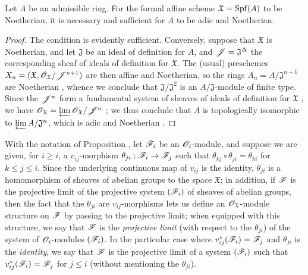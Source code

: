 \begin{corollary}[10.6.5]
\label{1.10.6.5}
Let $A$ be an admissible ring.
For the formal affine scheme $\mathfrak{X}=\operatorname{Spf}(A)$ to be Noetherian, it is necessary and sufficient for $A$ to be adic and Noetherian.
\end{corollary}

\begin{proof}
\label{proof-1.10.6.5}
The condition is evidently sufficient.
Conversely, suppose that $\mathfrak{X}$ is Noetherian, and let $\mathfrak{J}$ be an ideal of definition for $A$, and $\mathscr{J}=\mathfrak{J}^\Delta$ the corresponding sheaf of ideals of definition for $\mathfrak{X}$.
The (usual) preschemes $X_n=(\mathfrak{X},\mathscr{O}_\mathfrak{X}/\mathscr{J}^{n+1})$ are then affine and Noetherian, so the rings $A_n=A/\mathfrak{J}^{n+1}$ are Noetherian , whence we conclude that $\mathfrak{J}/\mathfrak{J}^2$ is an $A/\mathfrak{J}$-module of finite type.
Since the $\mathscr{J}^n$ form a fundamental system of sheaves of ideals of definition for $\mathfrak{X}$ , we have $\mathscr{O}_\mathfrak{X}=\varprojlim\mathscr{O}_\mathfrak{X}/\mathscr{J}^n$ ; we thus conclude  that $A$ is topologically isomorphic to $\varprojlim A/\mathfrak{J}^n$, which is adic and Noetherian .
\end{proof}

\begin{rmk}[10.6.6]
\label{1.10.6.6}
With the notation of Proposition , let $\mathscr{F}_i$ be an $\mathscr{O}_i$-module, and suppose we are given, for $i\geq i$, a $v_{ij}$-morphism $\theta_{ji}:\sh{F}_i\to\sh{F}_j$ such that $\theta_{kj}\circ\theta_{ji}=\theta_{ki}$ for $k\leq j\leq i$.
Since the underlying continuous map of $v_{ij}$ is the identity, $\theta_{ji}$ is a homomorphism of sheaves of abelian groups to the space $\mathfrak{X}$; in addition, if $\mathscr{F}$ is the projective limit of the projective system $(\mathscr{F}_i)$ of sheaves of abelian groups, then the fact that the $\theta_{ji}$ are $v_{ij}$-morphisms lets us define an $\mathscr{O}_\mathfrak{X}$-module structure on $\mathscr{F}$ by passing to the projective limit; when equipped with this structure, we say that $\mathscr{F}$ is the \emph{projective limit} (with respect to the $\theta_{ji}$) of the system of $\mathscr{O}_i$-modules $(\mathscr{F}_i)$.
In the particular case where $v_{ij}^*(\mathscr{F}_i)=\mathscr{F}_j$ and $\theta_{ji}$ is the \emph{identity}, we say that $\mathscr{F}$ is the projective limit of a system $(\mathscr{F}_i)$ such that $v_{ij}^*(\mathscr{F}_i)=\mathscr{F}_j$ for $j\leq i$ (without mentioning the $\theta_{ji}$).
\end{rmk}

